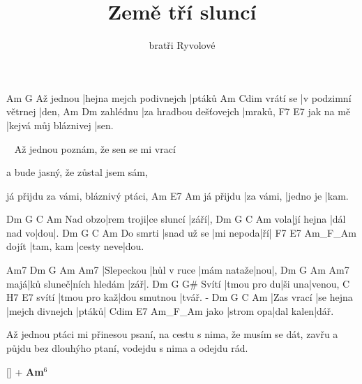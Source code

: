 \documentclass{song}
\author{bratři Ryvolové}
\title{Země tří sluncí}
\begin{document}
\strophe
          Am                      G
Až jednou |hejna mejch podivnejch |ptáků
         Am                  Cdim
vrátí se |v podzimní větrnej |den,
         Am                     Dm
zahlédnu |za hradbou dešťovejch |mraků,
          F7                   E7
jak na mě |kejvá můj bláznivej |sen.
\endstrophe

\strophe
~
Až jednou poznám, že sen se mi vrací

a bude jasný, že zůstal jsem sám,

já přijdu za vámi, bláznivý ptáci,
          Am        E7        Am
já přijdu |za vámi, |jedno je |kam.
\endstrophe

        Dm        G          C    Am
Nad obzo|rem troji|ce sluncí |září|,
    Dm        G          C   Am
vola|jí hejna |dál nad vo|dou|.
         Dm          G         C  Am
Do smrti |snad už se |mi nepoda|ří|
      F7        E7         Am_F_Am
dojít |tam, kam |cesty neve|dou.
\endstrophe

\strophe
Am7        Dm          G          Am  Am7
|Slepeckou |hůl v ruce |mám nataže|nou|,
    Dm        G            Am  Am7
majá|ků sluneč|ních hledám |zář|.
      Dm          G      G#
Svítí |tmou pro du|ši una|venou,
      C            H7           E7
svítí |tmou pro kaž|dou smutnou |tvář.
-          Dm        G               C     Am
|Zas vrací |se hejna |mejch divnejch |ptáků|
     Cdim      E7        Am_F_Am
jako |strom opa|dal kalen|dář.
\endstrophe

\strophe*
Až jednou ptáci mi přinesou psaní, 
na cestu s nima, že musím se dát, 
zavřu a půjdu bez dlouhýho ptaní, 
vodejdu s nima a odejdu rád.
\endstrophe

\ref{} + \textbf{Am$^6$}
\end{document}
